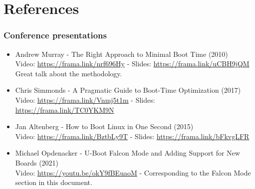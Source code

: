 \section{References}

\begin{frame}
\frametitle{Conference presentations}
\small
\begin{itemize}
\item Andrew Murray - The Right Approach to Minimal Boot Time (2010) \\
      Video: \url{https://frama.link/nrf696Hy} - Slides: \url{https://frama.link/uCBH9jQM} \\
      Great talk about the methodology.
\item Chris Simmonds - A Pragmatic Guide to Boot-Time Optimization (2017)\\
      Video: \url{https://frama.link/Vnmj5t1m} - Slides: \url{https://frama.link/TC0YKM9N}
\item Jan Altenberg - How to Boot Linux in One Second (2015)\\
      Video: \url{https://frama.link/BztbLy9T} - Slides: \url{https://frama.link/bFkvgLFR}
\item Michael Opdenacker - U-Boot Falcon Mode and Adding Support for New Boards (2021)\\
      Video: \url{https://youtu.be/okY9fBEuaoM} - Corresponding to the Falcon Mode section in this document.
\end{itemize}
\end{frame}
